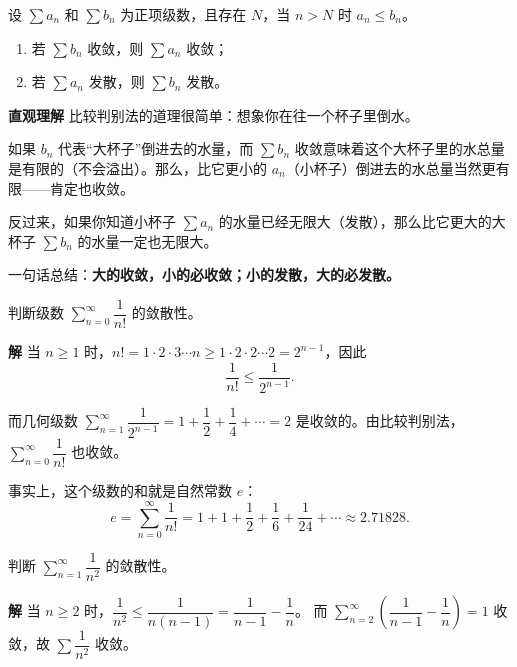 \documentclass{ctexart}
\newenvironment{custom}[1]{\par\noindent \textbf{#1}\quad}{\par\vspace{1em}}
\begin{document}
\begin{example}[加减结构中的错误示例]
\begin{theorem}[比较判别法]
设 \(\sum a_n\) 和 \(\sum b_n\) 为正项级数，且存在 \(N\)，当 \(n > N\) 时 \(a_n \leq b_n\)。
\begin{enumerate}
\item 若 \(\sum b_n\) 收敛，则 \(\sum a_n\) 收敛；
\item 若 \(\sum a_n\) 发散，则 \(\sum b_n\) 发散。
\end{enumerate}
\end{theorem}

\begin{custom}{直观理解}
比较判别法的道理很简单：想象你在往一个杯子里倒水。

如果 \(b_n\) 代表“大杯子”倒进去的水量，而 \(\sum b_n\) 收敛意味着这个大杯子里的水总量是有限的（不会溢出）。那么，比它更小的 \(a_n\)（小杯子）倒进去的水总量当然更有限——肯定也收敛。

反过来，如果你知道小杯子 \(\sum a_n\) 的水量已经无限大（发散），那么比它更大的大杯子 \(\sum b_n\) 的水量一定也无限大。

一句话总结：\textbf{大的收敛，小的必收敛；小的发散，大的必发散。}
\end{custom}

\begin{example}
判断级数 \(\sum_{n=0}^{\infty} \dfrac{1}{n!}\) 的敛散性。
\end{example}

\begin{custom}{解}
当 \(n \geq 1\) 时，\(n! = 1 \cdot 2 \cdot 3 \cdots n \geq 1 \cdot 2 \cdot 2 \cdots 2 = 2^{n-1}\)，因此
\[
\dfrac{1}{n!} \leq \dfrac{1}{2^{n-1}}.
\]

而几何级数 \(\sum_{n=1}^{\infty} \dfrac{1}{2^{n-1}} = 1 + \dfrac12 + \dfrac14 + \cdots = 2\) 是收敛的。由比较判别法，\(\sum_{n=0}^{\infty} \dfrac{1}{n!}\) 也收敛。

事实上，这个级数的和就是自然常数 \(e\)：
\[
e = \sum_{n=0}^{\infty} \dfrac{1}{n!} = 1 + 1 + \dfrac12 + \dfrac16 + \dfrac{1}{24} + \cdots \approx 2.71828.
\]
\end{custom}

\begin{example}
判断 \(\sum_{n=1}^{\infty} \dfrac{1}{n^2}\) 的敛散性。
\end{example}
\begin{custom}{解}
当 \(n \geq 2\) 时，\(\dfrac{1}{n^2} \leq \dfrac{1}{n(n-1)} = \dfrac{1}{n-1} - \dfrac{1}{n}\)。
而 \(\sum_{n=2}^{\infty} \left(\dfrac{1}{n-1} - \dfrac{1}{n}\right) = 1\) 收敛，故 \(\sum \dfrac{1}{n^2}\) 收敛。
\end{custom}


\end{example}
\end{document}
